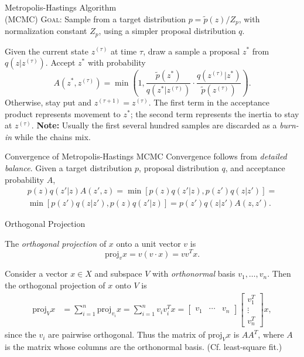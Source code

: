 \documentclass[avery5388, grid]{flashcards}
\begin{document}
\begin{flashcard}{Metropolis-Hastings Algorithm\\(MCMC)}
\textsc{Goal:} Sample from a target distribution $p=\tilde{p}(z)/Z_p$, with normalization constant $Z_p$, using a simpler proposal distribution $q$.
\begin{flushleft}
Given the current state $z^{(\tau)}$ at time $\tau$, draw a sample a proposal $z^*$ from $q(z|z^{(\tau)})$. Accept $z^*$ with probability 
$$A(z^*, z^{(\tau)}) = \min\left(1, \frac{\tilde{p}(z^*)}{q(z^*|z^{(\tau)})}\cdot \frac{q(z^{(\tau)}|z^*)}{\tilde{p}(z^{(\tau)})}\right).$$
Otherwise, stay put and $z^{(\tau+1)}=z^{(\tau)}.$
\vskip 5pt
The first term in the acceptance product represents movement to $z^*$; the second term represents the inertia to stay at $z^{(\tau)}$.
\vskip 5pt
\textsf{\textbf{Note:}} Usually the first several hundred samples are discarded as a \emph{burn-in} while the chains mix.
\end{flushleft}
\end{flashcard}

\begin{flashcard}{Convergence of Metropolis-Hastings MCMC}
Convergence follows from \emph{detailed balance}. Given a target distribution $p$, proposal distribution $q$, and acceptance probability $A$,
\begin{multline*}
p(z)q(z'|z)A(z', z)= \min\left[p(z)q(z'|z), p(z')q(z|z')\right]= \\ \min\left[p(z')q(z|z'), p(z)q(z'|z)\right] = p(z')q(z|z')A(z,z').
\end{multline*}
\end{flashcard}

\begin{flashcard}{Orthogonal Projection}
\begin{flushleft}
The \emph{orthogonal projection} of $x$ onto a unit vector $v$ is 
$$\mathrm{proj}_v x = v(v\cdot x) = vv^T x.$$

Consider a vector $x\in X$ and subspace $V$ with \emph{orthonormal} basis $v_1,\dots,v_n$. Then the orthogonal projection of $x$ onto $V$ is 
\begin{align*}
\mathrm{proj}_V x &= \sum_{i=1}^n \mathrm{proj}_{v_i} x=\sum_{i=1}^n v_iv_i^Tx= \begin{bmatrix}v_1 & \cdots & v_n\end{bmatrix}\begin{bmatrix}v_1^T\\ \vdots\\ v_n^T\end{bmatrix} x,
\end{align*}
since the $v_i$ are pairwise orthogonal. Thus the matrix of $\mathrm{proj}_V x$ is $AA^T$, where $A$ is the matrix whose columns are the orthonormal basis. (Cf. least-square fit.)
\end{flushleft}
\end{flashcard}
\end{document}
